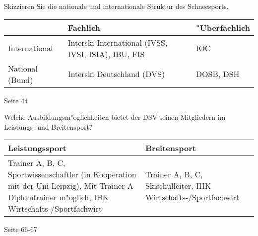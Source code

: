 \begin{question}{4}
Skizzieren Sie die nationale und internationale Struktur des Schneesports.
\end{question}
\begin{solution}

  \begin{table}[H]
    \label{strukturschneesport}
    \scriptsize
    \begin{center}
    \begin{tabular}{p{}|p{}|p{}}
        & \textbf{Fachlich} & \textbf{"Uberfachlich}\\
    \hline
      International & Interski International (IVSS, IVSI, ISIA), IBU, FIS & IOC\\
      National (Bund) & Interski Deutschland (DVS) & DOSB, DSH
    \end{tabular}
    \end{center}
  \end{table}

   Seite 44

\end{solution}

\begin{question}{4}
Welche Ausbildungsm"oglichkeiten bietet der DSV seinen Mitgliedern im Leistungs- und Breitensport?
\end{question}
\begin{solution}

  \begin{table}[H]
    \label{ausbildungen}
    \scriptsize
    \begin{center}
      \begin{tabular}{p{}|p{}}
        \textbf{Leistungssport} & \textbf{Breitensport}\\
      \hline
        Trainer A, B, C, Sportwissenschaftler (in Kooperation mit der Uni Leipzig), Mit Trainer A Diplomtrainer m"oglich, IHK Wirtschafts-/Sportfachwirt & Trainer A, B, C, Skischulleiter, IHK Wirtschafts-/Sportfachwirt
      \end{tabular}
    \end{center}
  \end{table}

   Seite 66-67

\end{solution}

